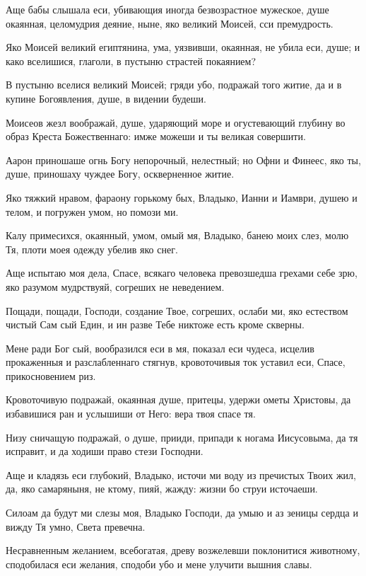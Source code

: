 Аще бабы слышала еси, убивающия иногда безвозрастное мужеское, душе окаянная, целомудрия деяние, ныне, яко великий Моисей, сси премудрость.

Яко Моисей великий египтянина, ума, уязвивши, окаянная, не убила еси, душе; и како вселишися, глаголи, в пустыню страстей покаянием?

В пустыню вселися великий Моисей; гряди убо, подражай того житие, да и в купине Богоявления, душе, в видении будеши.

Моисеов жезл воображай, душе, ударяющий море и огустевающий глубину во образ Креста Божественнаго: имже можеши и ты великая совершити.

Аарон приношаше огнь Богу непорочный, нелестный; но Офни и Финеес, яко ты, душе, приношаху чуждее Богу, оскверненное житие.

Яко тяжкий нравом, фараону горькому бых, Владыко, Ианни и Иамври, душею и телом, и погружен умом, но помози ми.

Калу примесихся, окаянный, умом, омый мя, Владыко, банею моих слез, молю Тя, плоти моея одежду убелив яко снег.

Аще испытаю моя дела, Спасе, всякаго человека превозшедша грехами себе зрю, яко разумом мудрствуяй, согреших не неведением.

Пощади, пощади, Господи, создание Твое, согреших, ослаби ми, яко естеством чистый Сам сый Един, и ин разве Тебе никтоже есть кроме скверны.

Мене ради Бог сый, вообразился еси в мя, показал еси чудеса, исцелив прокаженныя и разслабленнаго стягнув, кровоточивыя ток уставил еси, Спасе, прикосновением риз.

Кровоточивую подражай, окаянная душе, притецы, удержи ометы Христовы, да избавишися ран и услышиши от Него: вера твоя спасе тя.

Низу сничащую подражай, о душе, прииди, припади к ногама Иисусовыма, да тя исправит, и да ходиши право стези Господни.

Аще и кладязь еси глубокий, Владыко, источи ми воду из пречистых Твоих жил, да, яко самаряныня, не ктому, пияй, жажду: жизни бо струи источаеши.

Силоам да будут ми слезы моя, Владыко Господи, да умыю и аз зеницы сердца и вижду Тя умно, Света превечна.


Несравненным желанием, всебогатая, древу возжелевши поклонитися животному, сподобилася еси желания, сподоби убо и мене улучити вышния славы.

